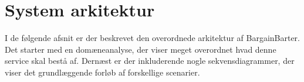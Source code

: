 \chapter{System arkitektur}
I de følgende afsnit er der beskrevet den overordnede arkitektur af BargainBarter. Det starter med en domæneanalyse, der viser meget overordnet hvad denne service skal bestå af. Dernæst er der inkluderende nogle sekvensdiagrammer, der viser det grundlæggende forløb af forskellige scenarier. 